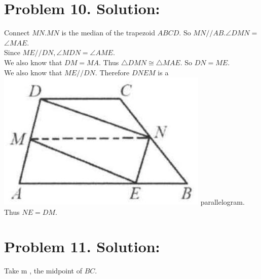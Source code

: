 \documentclass[10pt]{article}
\begin{document}
\section*{Problem 10. Solution:}
Connect \(M N . M N\) is the median of the trapezoid \(A B C D\). So \(M N / / A B . \angle D M N=\) \(\angle M A E\).\\
Since \(M E / / D N, \angle M D N=\angle A M E\).\\
We also know that \(D M=M A\). Thus \(\triangle D M N \cong \triangle M A E\). So \(D N=M E\).\\
We also know that \(M E / / D N\). Therefore \(D N E M\) is a\\
\includegraphics[max width=\textwidth]{2025_04_17_97bc1f7e44d93c271a88g-051} parallelogram. Thus \(N E=D M\).

\section*{Problem 11. Solution:}
Take m , the midpoint of \(B C\).
\end{document}
